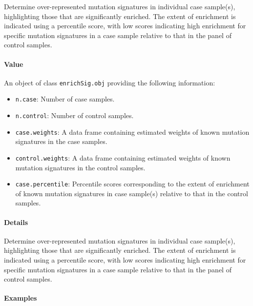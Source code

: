 \documentclass[]{article}
\providecommand{\tightlist}{%
  \setlength{\itemsep}{0pt}\setlength{\parskip}{0pt}}
\let\oldparagraph\paragraph
\renewcommand{\paragraph}[1]{\oldparagraph{#1}\mbox{}}
\begin{document}
Determine over-represented mutation signatures in individual case
sample(s), highlighting those that are significantly enriched. The
extent of enrichment is indicated using a percentile score, with low
scores indicating high enrichment for specific mutation signatures in a
case sample relative to that in the panel of control samples.

\paragraph{\texorpdfstring{\textbf{Value}}{Value}}\label{value-10}

An object of class \texttt{enrichSig.obj} providing the following
information:

\begin{itemize}
\tightlist
\item
  \texttt{n.case}: Number of case samples.
\item
  \texttt{n.control}: Number of control samples.
\item
  \texttt{case.weights}: A data frame containing estimated weights of
  known mutation signatures in the case samples.
\item
  \texttt{control.weights}: A data frame containing estimated weights of
  known mutation signatures in the control samples.
\item
  \texttt{case.percentile}: Percentile scores corresponding to the
  extent of enrichment of known mutation signatures in case sample(s)
  relative to that in the control samples.
\end{itemize}

\paragraph{\texorpdfstring{\textbf{Details}}{Details}}\label{details-8}

Determine over-represented mutation signatures in individual case
sample(s), highlighting those that are significantly enriched. The
extent of enrichment is indicated using a percentile score, with low
scores indicating high enrichment for specific mutation signatures in a
case sample relative to that in the panel of control samples.

\paragraph{\texorpdfstring{\textbf{Examples}}{Examples}}\label{examples-12}
\end{document}
